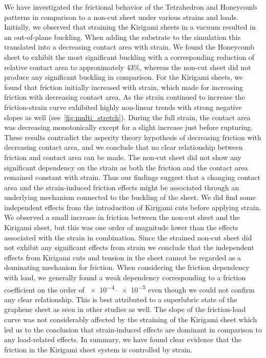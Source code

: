 
We have investigated the frictional behavior of the Tetrahedron and Honeycomb
patterns in comparison to a non-cut sheet under various strains and loads.
Initially, we observed that straining the Kirigami sheets in a vacuum resulted
in an out-of-plane buckling. When adding the substrate to the simulation this
translated into a decreasing contact area with strain. We found the Honeycomb
sheet to exhibit the most significant buckling with a corresponding reduction of
relative contact area to approximately 43\%, whereas the non-cut sheet did not
produce any significant buckling in comparison. For the Kirigami sheets, we
found that friction initially increased with strain, which made for increasing
friction with decreasing contact area. As the strain continued to increase the
friction-strain curve exhibited highly non-linear trends with strong negative
slopes as well (see~\cref{fig:multi_stretch}). During the full strain, the
contact area was decreasing monotonically except for a slight increase just
before rupturing. These results contradict the asperity theory hypothesis of
decreasing friction with decreasing contact area, and we conclude that no clear
relationship between friction and contact area can be made. The non-cut sheet
did not show any significant dependency on the strain as both the friction and
the contact area remained constant with strain. Thus our findings suggest that a
changing contact area and the strain-induced friction effects might be
associated through an underlying mechanism connected to the buckling of the
sheet. We did find some independent effects from the introduciton of Kirigami
cuts before applying strain. We observed a small increase in friction between
the non-cut sheet and the Kirigami sheet, but this was one order of magnitude
lower than the effects associated with the strain in combination. Since the
strained non-cut sheet did not exhibit any significant effects from strain we
conclude that the independent effects from Kirigami cuts and tension in the
sheet cannot be regarded as a dominating mechanism for friction. When
considering the friction dependency with load, we generally found a weak
dependency corresponding to a friction coefficient on the order of
\num{e-4}--\num{e-5} even though we could not confirm any clear relationship.
This is best attributed to a superlubric state of the graphene sheet as seen in
other studies as well. The slope of the friction-load curve was not considerably
affected by the straining of the Kirigami sheet which led us to the conclusion
that strain-induced effects are dominant in comparison to any load-related
effects. In summary, we have found clear evidence that the friction in the
Kirigami sheet system is controlled by strain. 

